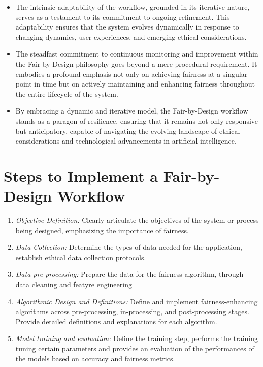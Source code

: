 \begin{enumerate}[label=\arabic*.]
\begin{itemize}
        \item The intrinsic adaptability of the workflow, grounded in its iterative nature, serves as a testament to its commitment to ongoing refinement. This adaptability ensures that the system evolves dynamically in response to changing dynamics, user experiences, and emerging ethical considerations.
    
        \item The steadfast commitment to continuous monitoring and improvement within the Fair-by-Design philosophy goes beyond a mere procedural requirement. It embodies a profound emphasis not only on achieving fairness at a singular point in time but on actively maintaining and enhancing fairness throughout the entire lifecycle of the system.
    
        \item By embracing a dynamic and iterative model, the Fair-by-Design workflow stands as a paragon of resilience, ensuring that it remains not only responsive but anticipatory, capable of navigating the evolving landscape of ethical considerations and technological advancements in artificial intelligence.
    
    \end{itemize}

\end{enumerate}

\section{Steps to Implement a Fair-by-Design Workflow}
\label{section:steps}

\begin{enumerate}

    \item \emph{Objective Definition:} Clearly articulate the objectives of the system or process being designed, emphasizing the importance of fairness.

    \item \emph{Data Collection:} Determine the types of data needed for the application, establish ethical data collection protocols.

    \item \emph{Data pre-processing:} Prepare the data for the fairness algorithm, through data cleaning and featyre engineering
    
    \item \emph{Algorithmic Design and Definitions:} Define and implement fairness-enhancing algorithms across pre-processing, in-processing, and post-processing stages. Provide detailed definitions and explanations for each algorithm.

    \item \emph{Model training and evaluation:} Define the training step, performs the training tuning certain parameters and provides an evaluation of the performances of the models based on accuracy and fairness metrics.

\end{enumerate}

